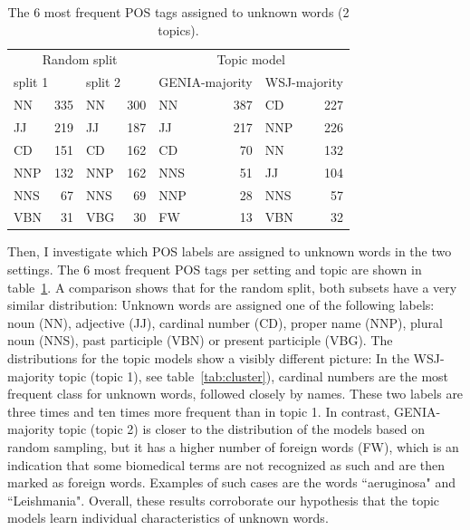 \begin{table}[t]
\begin{small}
	\begin{center}
		\begin{tabular}{lrlr|lrlr}
			\multicolumn{4}{c}{Random split} &  \multicolumn{4}{|c}{Topic model}\\
			\multicolumn{2}{l}{split 1} & \multicolumn{2}{l}{split 2} & \multicolumn{2}{|l}{GENIA-majority} & \multicolumn{2}{l}{WSJ-majority} \\
			\hline
			NN	& 335	&	NN	& 300		   & NN	  & 387 	& CD	&  227							\\
			JJ	& 219   &	JJ	& 187		   & JJ	  & 217 	& NNP	&  226							\\
			CD	& 151   &	CD	& 162		   & CD	  & 70		& NN	&  132 							\\
			NNP	& 132   &	NNP	& 162		   & NNS  & 51		& JJ	&  104 							\\
			NNS	& 67    &	NNS	& 69		   & NNP  & 28		& NNS	&  57 							\\
			VBN	& 31    &	VBG	& 30		   & FW	  & 13		& VBN	&  32 							\\
			\hline
		\end{tabular}
	\end{center}
	\end{small}
	\caption{The 6 most frequent POS tags assigned to unknown words (2 topics).\label{tab:res:unkpos}}
\end{table}


Then, I investigate which POS labels are assigned to unknown words in the two settings. The 6 most frequent POS tags per setting and topic are shown in table~\ref{tab:res:unkpos}. A comparison shows that for the random split, both subsets have a very similar distribution: Unknown words are assigned one of the following labels: noun (NN), adjective (JJ), cardinal number (CD), proper name (NNP),  plural noun (NNS), past participle (VBN) or present  participle (VBG). The distributions for the topic models show a visibly different picture: In the %
WSJ-majority topic (topic 1), see table~\ref{tab:cluster}), cardinal numbers are the most frequent class for unknown words, followed closely by names. These two labels are three times and ten times more frequent than in topic 1.  In contrast, GENIA-majority topic (topic 2) is closer to the distribution of the models based on random sampling, but it has a higher number of foreign words (FW), which is an indication that some biomedical terms are not recognized as such and are then marked as foreign words. Examples of such cases  are the words ``aeruginosa" and ``Leishmania". Overall, these results  corroborate our hypothesis that the topic models learn individual characteristics of unknown words.

